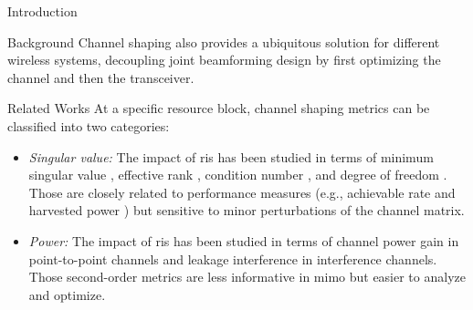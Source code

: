 \documentclass[journal]{IEEEtran}
\begin{document}
\begin{section}{Introduction}
\begin{subsection}{Background}
		Channel shaping also provides a ubiquitous solution for different wireless systems, decoupling joint beamforming design by first optimizing the channel and then the transceiver.
	\end{subsection}

	\begin{subsection}{Related Works}
		At a specific resource block, channel shaping metrics can be classified into two categories:
		\begin{itemize}
			\item \emph{Singular value:} The impact of \gls{ris} has been studied in terms of minimum singular value \cite{ElMossallamy2021}, effective rank \cite{ElMossallamy2021,Meng2023}, condition number \cite{Zheng2022,Huang2023}, and degree of freedom \cite{Bafghi2022,Zheng2023,Chae2023}. Those are closely related to performance measures (e.g., achievable rate and harvested power \cite{Shen2021}) but sensitive to minor perturbations of the channel matrix.
			\item \emph{Power:} The impact of \gls{ris} has been studied in terms of channel power gain \cite{Wu2019,Shen2020a,Nerini2023,Nerini2024,Santamaria2023} in point-to-point channels and leakage interference \cite{Santamaria2023a} in interference channels. Those second-order metrics are less informative in \gls{mimo} but easier to analyze and optimize.
		\end{itemize}


\end{subsection}
\end{section}
\end{document}
